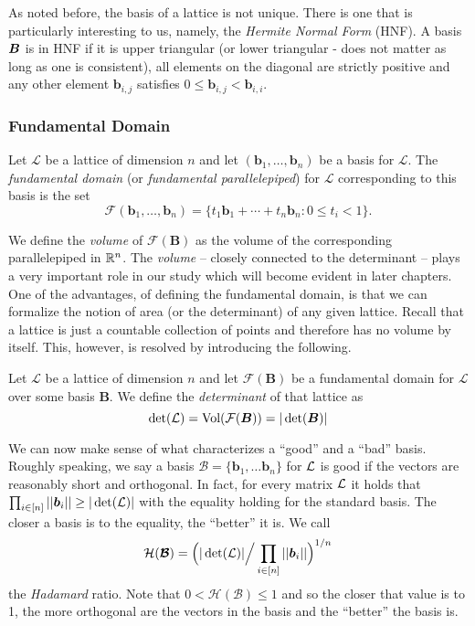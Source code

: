 As noted before, the basis of a lattice is not unique. There is one that is particularly interesting to us, namely, the \textit{Hermite Normal Form} (HNF). A basis $\boldsymbol{B}$ is in HNF if it is upper triangular (or lower triangular - does not matter as long as one is consistent), all elements on the diagonal are strictly positive and any other element $\bm{b}_{i,j}$ satisfies $0 \leq \bm{b}_{i,j} < \bm{b}_{i,i}$.

\subsubsection*{Fundamental Domain}
\begin{definition} \label{fundamental}
    Let $\mathcal{L}$ be a lattice of dimension $n$ and let $(\bm{b}_1, \dots, \bm{b}_n)$ be a basis for $\mathcal{L}$. The \textit{fundamental domain} (or \textit{fundamental parallelepiped}) for $\mathcal{L}$ corresponding to this basis is the set
    $$ \mathcal{F}(\bm{b}_1, \dots, \bm{b}_n) = \{t_1\bm{b}_1 + \cdots + t_n\bm{b}_n : 0 \leq t_i < 1 \}.$$
\end{definition}

We define the \textit{volume} of $\mathcal{F}(\bm{B})$ as the volume of the corresponding parallelepiped in $\mathbb{R}^n$. The \textit{volume} -- closely connected to the determinant -- plays a very important role in our study which will become evident in later chapters. One of the advantages, of defining the fundamental domain, is that we can formalize the notion of area (or the determinant) of any given lattice. Recall that a lattice is just a countable collection of points and therefore has no volume by itself. This, however, is resolved by introducing the following.

\begin{definition}
    Let $\mathcal{L}$ be a lattice of dimension $n$ and let $\mathcal{F}(\bm{B})$ be a fundamental domain for $\mathcal{L}$ over some basis $\bm{B}$. We define the \textit{determinant} of that lattice as
	\[ \det (\mathcal{L}) = \text{Vol}(\mathcal{F(\boldsymbol{B})}) = |\det (\boldsymbol{B}) | \]
\end{definition}

We can now make sense of what characterizes a ``good'' and a ``bad'' basis. Roughly speaking, we say a basis $\bm{\mathcal{B}} = \{\bm{b}_1, \ldots \bm{b}_n\}$ for $\mathcal{L}$ is good if the vectors are reasonably short and orthogonal. In fact, for every matrix $\mathcal{L}$ it holds that $\prod_{i \in [n]} ||\boldsymbol{b}_i || \geq |\det(\mathcal{L})|$ with the equality holding for the standard basis. The closer a basis is to the equality, the ``better'' it is. We call
\begin{equation}\label{hadamard}
\mathcal{H}(\boldsymbol{\mathcal{B}}) = \Big(|\det(\mathcal{L}) | \Big/ \prod_{i \in [n]} ||\boldsymbol{b}_i || \Big)^{1/n}
\end{equation}
the \textit{Hadamard} ratio. Note that $0 < \mathcal{H}(\bm{\mathcal{B}}) \leq 1$ and so the closer that value is to 1, the more orthogonal are the vectors in the basis and the ``better'' the basis is.

